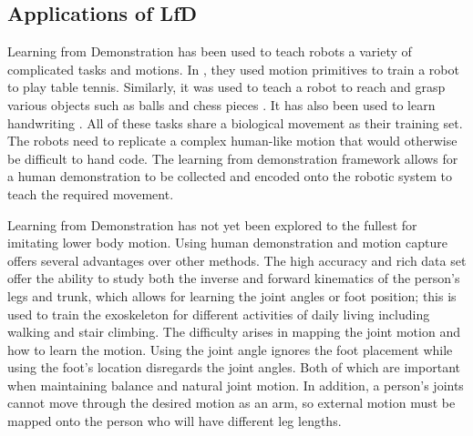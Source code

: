 \subsection{Applications of LfD}
\label{sec:applfd}
Learning from Demonstration has been used to teach robots a variety of complicated tasks and motions. In \cite{mulling2013learning}, they used motion primitives to train a robot to play table tennis. Similarly, it was used to teach a robot to reach and grasp various objects such as balls and chess pieces \cite{calinon2007active}  \cite{hersch2008dynamical}. It has also been used to learn handwriting \cite{kulvicius2011joining}. All of these tasks share a biological movement as their training set. The robots need to replicate a complex human-like motion that would otherwise be difficult to hand code. The learning from demonstration framework allows for a human demonstration to be collected and encoded onto the robotic system to teach the required movement.  

Learning from Demonstration has not yet been explored to the fullest for imitating lower body motion. Using human demonstration and motion capture offers several advantages over other methods. The high accuracy and rich data set offer the ability to study both the inverse and forward kinematics of the person's legs and trunk, which allows for learning the joint angles or foot position; this is used to train the exoskeleton for different activities of daily living including walking and stair climbing. The difficulty arises in mapping the joint motion and how to learn the motion. Using the joint angle ignores the foot placement while using the foot's location disregards the joint angles. Both of which are important when maintaining balance and natural joint motion. In addition, a person's joints cannot move through the desired motion as an arm, so external motion must be mapped onto the person who will have different leg lengths. 




